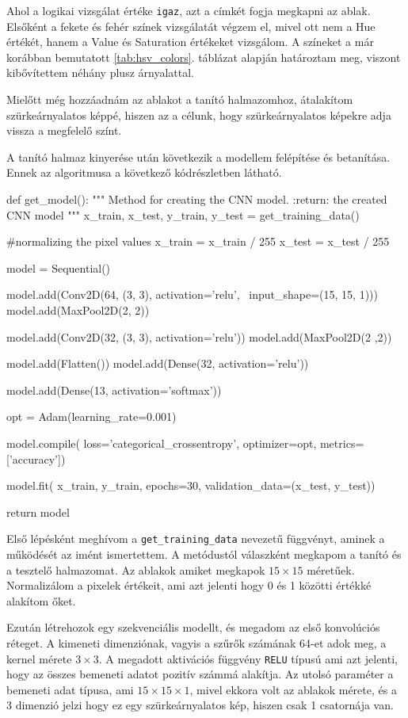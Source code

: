 Ahol a logikai vizsgálat értéke \texttt{igaz}, azt a címkét fogja megkapni az ablak. Elsőként a fekete és fehér színek vizsgálatát végzem el, mivel ott nem a Hue értékét, hanem a Value és Saturation értékeket vizsgálom. A színeket a már korábban bemutatott \ref{tab:hsv_colors}. táblázat alapján határoztam meg, viszont kibővítettem néhány plusz árnyalattal.

Mielőtt még hozzáadnám az ablakot a tanító halmazomhoz, átalakítom szürkeárnyalatos képpé, hiszen az a célunk, hogy szürkeárnyalatos képekre adja vissza a megfelelő színt.

A tanító halmaz kinyerése után következik a modellem felépítése és betanítása. Ennek az algoritmusa a következő kódrészletben látható.
\begin{python}
def get_model():
    """
    Method for creating the CNN model.
    :return: the created CNN model
    """
    x_train, x_test, y_train, y_test = get_training_data()

    #normalizing the pixel values
    x_train = x_train / 255
    x_test = x_test / 255

    model = Sequential()

    model.add(Conv2D(64, (3, 3), activation='relu', \
    	input_shape=(15, 15, 1)))
    model.add(MaxPool2D(2, 2))

    model.add(Conv2D(32, (3, 3), activation='relu'))
    model.add(MaxPool2D(2 ,2))

    model.add(Flatten())
    model.add(Dense(32, activation='relu'))

    model.add(Dense(13, activation='softmax'))

    opt = Adam(learning_rate=0.001)

    model.compile(
        loss='categorical_crossentropy',
        optimizer=opt,
        metrics=['accuracy'])

    model.fit(
        x_train,
        y_train,
        epochs=30,
        validation_data=(x_test, y_test))

    return model
\end{python}

Első lépésként meghívom a \texttt{get\_training\_data} nevezetű függvényt, aminek a működését az imént ismertettem. A metódustól válaszként megkapom a tanító és a tesztelő halmazomat. Az ablakok amiket megkapok $15 \times 15$ méretűek. Normalizálom a pixelek értékeit, ami azt jelenti hogy 0 és 1 közötti értékké alakítom őket.

Ezután létrehozok egy szekvenciális modellt, és megadom az első konvolúciós réteget. A kimeneti dimenziónak, vagyis a szűrők számának 64-et adok meg, a kernel mérete $3 \times 3$. A megadott aktivációs függvény \texttt{RELU} típusú ami azt jelenti, hogy az összes bemeneti adatot pozitív számmá alakítja. Az utolsó paraméter a bemeneti adat típusa, ami $15 \times 15 \times 1$, mivel ekkora volt az ablakok mérete, és a 3 dimenzió jelzi hogy ez egy szürkeárnyalatos kép, hiszen csak 1 csatornája van.

